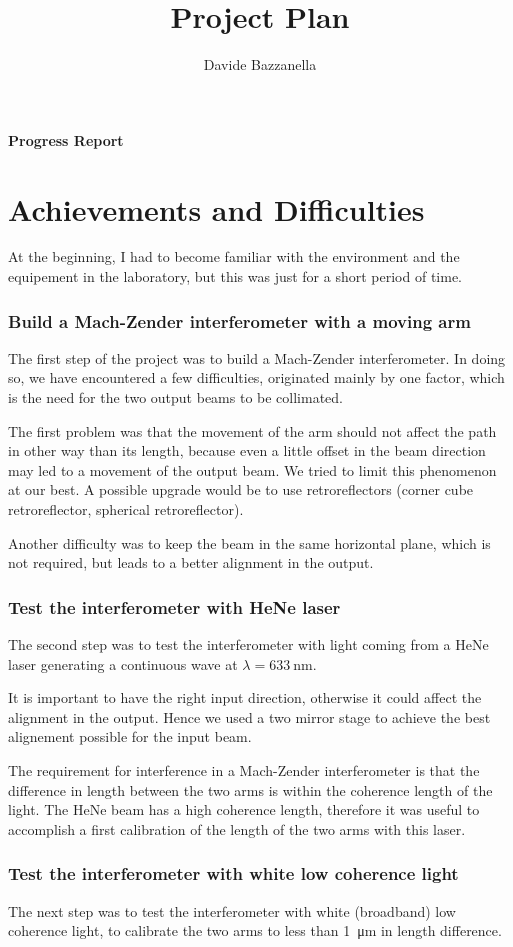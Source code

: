 \documentclass[12pt,a4paper]{report}
\author{Davide Bazzanella}
\title{Project Plan}
\begin{document}
\textbf{\Huge{Progress Report}}
\section*{Achievements and Difficulties}
At the beginning, I had to become familiar with the environment and the equipement in the laboratory, but this was just for a short period of time.
\subsubsection*{Build a Mach-Zender interferometer with a moving arm}
The first step of the project was to build a Mach-Zender interferometer.
In doing so, we have encountered a few difficulties, originated mainly by one factor, which is the need for the two output beams to be collimated.

The first problem was that the movement of the arm should not affect the path in other way than its length, because even a little offset in the beam direction may led to a movement of the output beam.
We tried to limit this phenomenon at our best.
A possible upgrade would be to use retroreflectors (corner cube retroreflector, spherical retroreflector).

Another difficulty was to keep the beam in the same horizontal plane, which is not required, but leads to a better alignment in the output.

\subsubsection*{Test the interferometer with HeNe laser}
The second step was to test the interferometer with light coming from a HeNe laser generating a continuous wave at $\lambda = \SI{633}{\nm}$.

It is important to have the right input direction, otherwise it could affect the alignment in the output.
Hence we used a two mirror stage to achieve the best alignement possible for the input beam.

The requirement for interference in a Mach-Zender interferometer is that the difference in length between the two arms is within the coherence length of the light.
The HeNe beam has a high coherence length, therefore it was useful to accomplish a first calibration of the length of the two arms with this laser.

\subsubsection*{Test the interferometer with white low coherence light}
The next step was to test the interferometer with white (broadband) low coherence light, to calibrate the two arms to less than \SI{1}{\um} in length difference.
\end{document}
